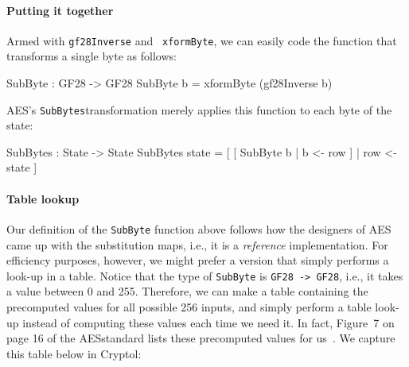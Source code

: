 
\paragraph*{Putting it together} Armed with {\tt gf28Inverse} and {\tt
  xformByte}, we can easily code the function that transforms a single
byte as follows:
\begin{code}
  SubByte : GF28 -> GF28
  SubByte b = xformByte (gf28Inverse b)
\end{code}
AES's {\tt SubBytes}\indAES transformation merely applies this
function to each byte of the state:
\begin{code}
  SubBytes : State -> State
  SubBytes state = [ [ SubByte b | b <- row ] | row <- state ]
\end{code}

\paragraph*{Table lookup} Our definition of the {\tt SubByte} function
above follows how the designers of AES came up with the substitution
maps, i.e., it is a {\em reference} implementation. For efficiency
purposes, however, we might prefer a version that simply performs a
look-up in a table. Notice that the type of {\tt SubByte} is {\tt GF28
  -> GF28}, i.e., it takes a value between 0 and 255. Therefore, we
can make a table containing the precomputed values for all possible
256 inputs, and simply perform a table look-up instead of computing
these values each time we need it.  In fact, Figure~7 on page 16 of
the AES\indAES standard lists these precomputed values for
us~\cite[section 5.1.1]{aes}. We capture this table below in Cryptol:

